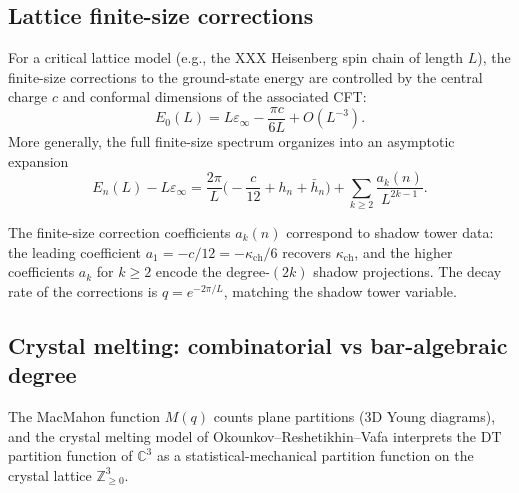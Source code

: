 
\subsection{Lattice finite-size corrections}
\label{subsec:lattice-finite-size}

For a critical lattice model (e.g., the XXX Heisenberg spin chain of length $L$), the finite-size corrections to the ground-state energy are controlled by the central charge $c$ and conformal dimensions of the associated CFT:
\[
 E_0(L) = L \varepsilon_\infty - \frac{\pi c}{6L} + O(L^{-3}).
\]
More generally, the full finite-size spectrum organizes into an asymptotic expansion
\[
 E_n(L) - L \varepsilon_\infty = \frac{2\pi}{L} \bigl( -\frac{c}{12} + h_n + \bar{h}_n \bigr) + \sum_{k \geq 2} \frac{a_k(n)}{L^{2k-1}}.
\]

\begin{conjecture}
\label{conj:finite-size-shadow}
\ClaimStatusConjectured
The finite-size correction coefficients $a_k(n)$ correspond to shadow tower data: the leading coefficient $a_1 = -c/12 = -\kappa_{\mathrm{ch}}/6$ recovers $\kappa_{\mathrm{ch}}$, and the higher coefficients $a_k$ for $k \geq 2$ encode the degree-$(2k)$ shadow projections. The decay rate of the corrections is $q = e^{-2\pi/L}$, matching the shadow tower variable.
\end{conjecture}


\subsection{Crystal melting: combinatorial vs bar-algebraic degree}
\label{subsec:crystal-melting}

The MacMahon function $M(q)$ counts plane partitions (3D Young diagrams), and the crystal melting model of Okounkov--Reshetikhin--Vafa interprets the DT partition function of $\mathbb{C}^3$ as a statistical-mechanical partition function on the crystal lattice $\mathbb{Z}^3_{\geq 0}$.

